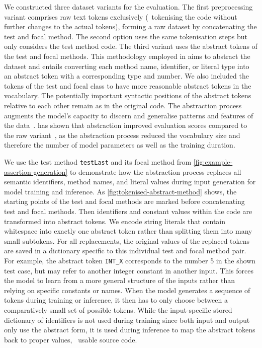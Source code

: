 We constructed three dataset variants for the evaluation.
The first preprocessing variant comprises raw text tokens exclusively
(\ie~tokenising the code without further changes to the actual
tokens), forming a raw dataset by concatenating the test and focal
method.
The second option uses the same tokenisation steps but only considers
the test method code.
The third variant uses the abstract tokens of the test and focal
methods. This methodology employed in \atlas aims to abstract the
dataset and entails converting each method name, identifier, or
literal type into an abstract token with a corresponding type and
number. We also included the tokens of the test and focal class to
have more reasonable abstract tokens in the vocabulary. The
potentially important syntactic positions of the abstract tokens
relative to each other remain as in the original code.
The abstraction process augments the model’s capacity to discern and
generalise patterns and features of the data~\cite{Tufano2019,
Tufano2018, Tufano2019a, Watson2020}\@. \atlas has shown that
abstraction improved evaluation scores compared to the raw
variant~\cite{Watson2020}, as the abstraction process reduced the
vocabulary size and therefore the number of model parameters as well
as the training duration.



We use the test method \texttt{testLast} and its focal method from
\cref{fig:example-assertion-generation} to demonstrate how the
abstraction process replaces all semantic identifiers, method names,
and literal values during input generation for model training and
inference.
As \cref{fig:tokenised-abstract-method} shows, the starting points of
the test and focal methods are marked before concatenating test and
focal methods.
Then identifiers and constant values within the code are transformed
into abstract tokens. We encode string literals that contain
whitespace into exactly one abstract token rather than splitting them
into many small subtokens.
For all replacements, the original values of the replaced tokens are
saved in a dictionary specific to this individual test and focal
method pair.
For example, the abstract token \texttt{INT\_X} corresponds to the
number 5 in the shown test case, but may refer to another integer
constant in another input. This forces the model to learn from a more
general structure of the inputs rather than relying on specific
constants or names.
When the model generates a sequence of tokens during training or
inference, it then has to only choose between a comparatively small
set of possible tokens.
While the input-specific stored dictionary of identifiers is not used
during training since both input and output only use the abstract
form, it is used during inference to map the abstract tokens back to
proper values, \ie~usable source code.

